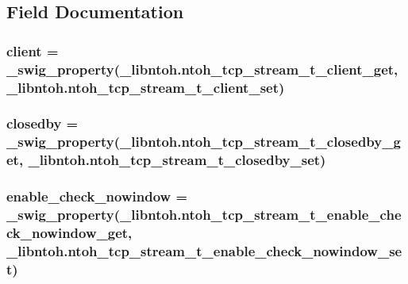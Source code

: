 \subsection{Field Documentation}
\hypertarget{classlibntoh_1_1ntoh__tcp__stream__t_aabcf5d3b98f85310bb8b763c3b935666}{
\subsubsection[{client}]{ client = {\bf \-\_\-swig\-\_\-property}(\-\_\-libntoh.\-ntoh\-\_\-tcp\-\_\-stream\-\_\-t\-\_\-client\-\_\-get, \-\_\-libntoh.\-ntoh\-\_\-tcp\-\_\-stream\-\_\-t\-\_\-client\-\_\-set)\hspace{0.3cm}{\ttfamily [static]}}}\label{classlibntoh_1_1ntoh__tcp__stream__t_aabcf5d3b98f85310bb8b763c3b935666}
\hypertarget{classlibntoh_1_1ntoh__tcp__stream__t_a736d15e1443bece09d760478e5f42c09}{
\subsubsection[{closedby}]{ closedby = {\bf \-\_\-swig\-\_\-property}(\-\_\-libntoh.\-ntoh\-\_\-tcp\-\_\-stream\-\_\-t\-\_\-closedby\-\_\-get, \-\_\-libntoh.\-ntoh\-\_\-tcp\-\_\-stream\-\_\-t\-\_\-closedby\-\_\-set)\hspace{0.3cm}{\ttfamily [static]}}}\label{classlibntoh_1_1ntoh__tcp__stream__t_a736d15e1443bece09d760478e5f42c09}
\hypertarget{classlibntoh_1_1ntoh__tcp__stream__t_ad528a3c30634bf94345f9a1126bcad6a}{
\subsubsection[{enable\-\_\-check\-\_\-nowindow}]{ enable\-\_\-check\-\_\-nowindow = {\bf \-\_\-swig\-\_\-property}(\-\_\-libntoh.\-ntoh\-\_\-tcp\-\_\-stream\-\_\-t\-\_\-enable\-\_\-check\-\_\-nowindow\-\_\-get, \-\_\-libntoh.\-ntoh\-\_\-tcp\-\_\-stream\-\_\-t\-\_\-enable\-\_\-check\-\_\-nowindow\-\_\-set)\hspace{0.3cm}{\ttfamily [static]}}}\label{classlibntoh_1_1ntoh__tcp__stream__t_ad528a3c30634bf94345f9a1126bcad6a}
